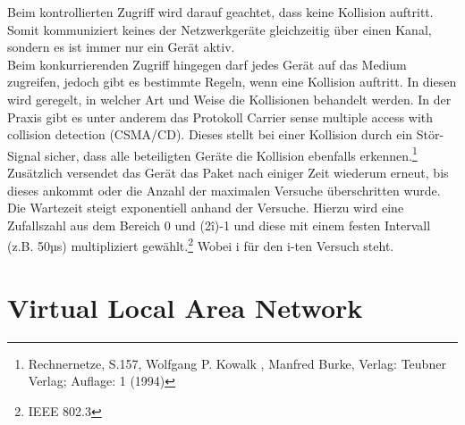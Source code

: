 Beim kontrollierten Zugriff wird darauf geachtet, dass keine Kollision auftritt. Somit kommuniziert keines der Netzwerkgeräte gleichzeitig über einen Kanal, sondern es ist immer nur ein Gerät aktiv.\\
Beim konkurrierenden Zugriff hingegen darf jedes Gerät auf das Medium zugreifen, jedoch gibt es bestimmte Regeln, wenn eine Kollision auftritt. In diesen wird geregelt, in welcher Art und Weise die Kollisionen behandelt werden.
In der Praxis gibt es unter anderem das Protokoll Carrier sense multiple access with collision detection (CSMA/CD).
Dieses stellt bei einer Kollision durch ein Stör-Signal sicher, dass alle beteiligten Geräte die Kollision ebenfalls erkennen.\footnote{Rechnernetze, S.157, Wolfgang P. Kowalk , Manfred Burke, Verlag: Teubner Verlag; Auflage: 1 (1994)}
Zusätzlich versendet das Gerät das Paket nach einiger Zeit wiederum erneut, bis dieses ankommt oder die Anzahl der maximalen Versuche überschritten wurde.
Die Wartezeit steigt exponentiell anhand der Versuche.
Hierzu wird eine Zufallszahl aus dem Bereich 0 und (2\^i)-1 und diese mit einem festen Intervall (z.B. 50µs) multipliziert gewählt.\footnote{IEEE 802.3}
Wobei i für den i-ten Versuch steht.

\section{Virtual Local Area Network}
\label{sec:vlan}

